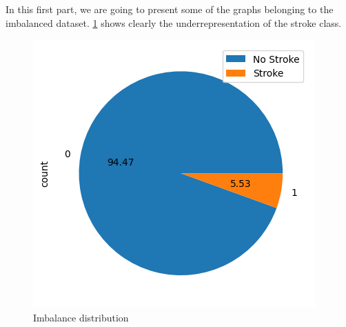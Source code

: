 \documentclass{Configuration_Files/Template}
\begin{document}
In this first part, we are going to present some of the graphs belonging to the imbalanced dataset.
\ref{fig:dataset_imbalance} shows clearly the underrepresentation of the stroke class.

\begin{figure}[h]
\centering
\includegraphics[scale=0.4]{Images/imbalance_pie.png}
\caption{Imbalance distribution}
\label{fig:dataset_imbalance}
\end{figure}
\end{document}
